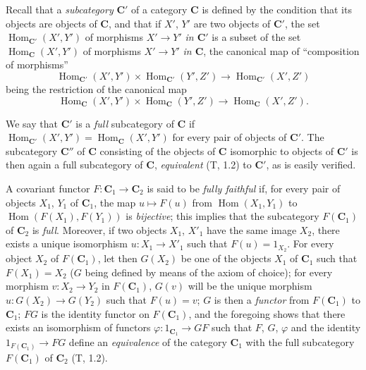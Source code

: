 \begin{env}[8.1.5]
\label{0.8.1.5}
Recall that a \emph{subcategory} $\boldsymbol{C}'$ of a category $\boldsymbol{C}$ is defined
by the condition that its objects are objects of $\boldsymbol{C}$, and that if $X'$,
$Y'$ are two objects of $\boldsymbol{C}'$, the set
$\operatorname{Hom}_{\mathbf{C}'}(X',Y')$ of morphisms $X'\to Y'$ \emph{in
$\boldsymbol{C}'$} is a subset of the set $\operatorname{Hom}_{\mathbf{C}}(X',Y')$ of
morphisms $X'\to Y'$ \emph{in $\boldsymbol{C}$}, the canonical map of
``composition of morphisms''
\[
  \operatorname{Hom}_{\mathbf{C}'}(X',Y')\times\operatorname{Hom}_{\mathbf{C}'}(Y',Z')
  \to\operatorname{Hom}_{\mathbf{C}'}(X',Z')
\]
being the restriction of the canonical map
\[
  \operatorname{Hom}_{\mathbf{C}}(X',Y')\times\operatorname{Hom}_{\mathbf{C}}(Y',Z')
  \to\operatorname{Hom}_{\mathbf{C}}(X',Z').
\]

We say that $\boldsymbol{C}'$ is a \emph{full} subcategory of $\boldsymbol{C}$ if
$\operatorname{Hom}_{\mathbf{C}'}(X',Y')=\operatorname{Hom}_{\mathbf{C}}(X',Y')$ for every
pair of objects of $\boldsymbol{C}'$. The subcategory $\boldsymbol{C}''$ of $\boldsymbol{C}$ consisting of the
objects of $\boldsymbol{C}$ isomorphic to objects of $\boldsymbol{C}'$ is then again a full
subcategory of $\boldsymbol{C}$, \emph{equivalent} (T, 1.2) to $\boldsymbol{C}'$, as is easily
verified.

A covariant functor $F:\boldsymbol{C}_1\to\boldsymbol{C}_2$ is said to be \emph{fully faithful} if,
for every pair of objects $X_1$, $Y_1$ of $\boldsymbol{C}_1$, the map
$u\mapsto F(u)$ from $\operatorname{Hom}(X_1,Y_1)$ to
$\operatorname{Hom}(F(X_1),F(Y_1))$ is \emph{bijective}; this implies that
the subcategory $F(\boldsymbol{C}_1)$ of $\boldsymbol{C}_2$ is \emph{full}. Moreover, if two
objects $X_1$, $X'_1$ have the same image $X_2$, there exists a unique
isomorphism $u:X_1\to X'_1$ such that $F(u)=1_{X_2}$. For every object $X_2$
of $F(\boldsymbol{C}_1)$, let then $G(X_2)$ be one of the objects $X_1$ of $\boldsymbol{C}_1$ such that
$F(X_1)=X_2$ ($G$ being defined by means of the axiom of choice); for every
morphism $v:X_2\to Y_2$ in $F(\boldsymbol{C}_1)$, $G(v)$ will be the unique morphism
$u:G(X_2)\to G(Y_2)$ such that $F(u)=v$; $G$ is then a \emph{functor} from
$F(\boldsymbol{C}_1)$ to $\boldsymbol{C}_1$; $FG$ is the identity functor on $F(\boldsymbol{C}_1)$, and the
foregoing shows that there exists an isomorphism of functors
$\varphi:\boldsymbol{\mathit{1}}_{\mathbf{C}_1}\to GF$ such that $F$, $G$, $\varphi$ and the identity
$\boldsymbol{\mathit{1}}_{F(\mathbf{C}_1)}\to FG$ define an \emph{equivalence} of the category $\boldsymbol{C}_1$
with the full subcategory $F(\boldsymbol{C}_1)$ of $\boldsymbol{C}_2$ (T, 1.2).
\end{env}

